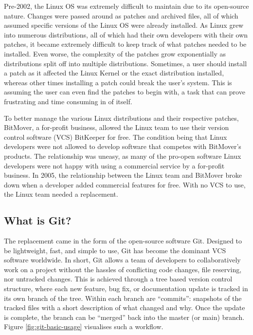 \documentclass[11pt]{article}
\begin{document}
Pre-2002, the Linux OS was extremely difficult to maintain due to its open-source nature. Changes were passed around as patches and archived files, all of which assumed specific versions of the Linux OS were already installed. As Linux grew into numerous distributions, all of which had their own developers with their own patches, it became extremely difficult to keep track of what patches needed to be installed. Even worse, the complexity of the patches grow exponentially as distributions split off into multiple distributions. Sometimes, a user should install a patch as it affected the Linux Kernel or the exact distribution installed, whereas other times installing a patch could break the user's system. This is assuming the user can even find the patches to begin with, a task that can prove frustrating and time consuming in of itself.

To better manage the various Linux distributions and their respective patches, BitMover, a for-profit business, allowed the Linux team to use their version control software (VCS) BitKeeper for free. The condition being that Linux developers were not allowed to develop software that competes with BitMover's products. The relationship was uneasy, as many of the pro-open software Linux developers were not happy with using a commercial service by a for-profit business. In 2005, the relationship between the Linux team and BitMover broke down when a developer added commercial features for free. With no VCS to use, the Linux team needed a replacement.

\subsection{What is Git?}

The replacement came in the form of the open-source software Git. Designed to be lightweight, fast, and simple to use, Git has become the dominant VCS software worldwide. In short, Git allows a team of developers to collaboratively work on a project without the hassles of conflicting code changes, file reserving, nor untracked changes. This is achieved through a tree based version control structure, where each new feature, bug fix, or documentation update is tracked in its own branch of the tree. Within each branch are ``commits'': snapshots of the tracked files with a short description of what changed and why. Once the update is complete, the branch can be ``merged'' back into the master (or main) branch. Figure \ref{fig:git-basic-usage} visualises such a workflow.
\end{document}
